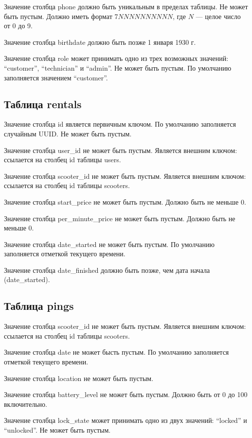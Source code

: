 Значение столбца phone должно быть уникальным в пределах таблицы. Не может быть пустым. Должно иметь формат 7$NNNNNNNNNN$, где $N$ --- целое число от 0 до 9.

Значение столбца birthdate должно быть позже 1 января 1930 г.

Значение столбца role может принимать одно из трех возможных значений: \enquote{customer}, \enquote{technician} и \enquote{admin}. Не может быть пустым. По умолчанию заполняется значением \enquote{customer}.

\subsection{Таблица rentals}

Значение столбца id является первичным ключом. По умолчанию заполняется случайным UUID. Не может быть пустым.

Значение столбца user\_id не может быть пустым. Является внешним ключом: ссылается на столбец id таблицы users.

Значение столбца scooter\_id не может быть пустым. Является внешним ключом: ссылается на столбец id таблицы scooters.

Значение столбца start\_price не может быть пустым. Должно быть не меньше 0.

Значение столбца per\_minute\_price не может быть пустым. Должно быть не меньше 0.

Значение столбца date\_started не может быть пустым. По умолчанию заполняется отметкой текущего времени.

Значение столбца date\_finished должно быть позже, чем дата начала (date\_started).

\subsection{Таблица pings}

Значение столбца scooter\_id не может быть пустым. Является внешним ключом: ссылается на столбец id таблицы scooters.

Значение столбца date не может бысть пустым. По умолчанию заполняется отметкой текущего времени.

Значение столбца location не может быть пустым.

Значение столбца battery\_level не может быть пустым. Должно быть от 0 до 100 включительно.

Значение столбца lock\_state может принимать одно из двух значений: \enquote{locked} и \enquote{unlocked}. Не может быть пустым.

